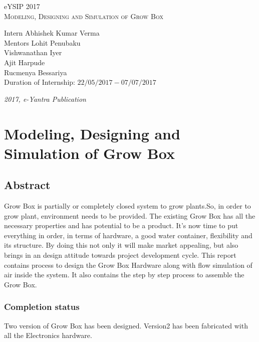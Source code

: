 \documentclass[a4paper,12pt,oneside]{book}
\begin{document}
\begin{titlepage}
\raggedright
{\Large eYSIP 2017\\[1cm]}
{\Huge\scshape Modeling, Designing and Simulation of Grow Box \\[.1in]}
\vfill
\begin{flushright}
{\large Intern Abhishek Kumar Verma \\}
{\large Mentors \hspace{35pt} Lohit Penubaku \\}
{\large Vishwanathan Iyer \\}
{\large Ajit Harpude \\}
{\large Rucmenya Bessariya \\}
{\large Duration of Internship: $ 22/05/2017-07/07/2017 $ \\}
\end{flushright}

{\itshape 2017, e-Yantra Publication}
\end{titlepage}

\chapter[Project Tag]{Modeling, Designing and Simulation of Grow Box}
\section*{Abstract}
Grow Box is partially or completely closed system to grow plants.So, in order to grow plant, environment needs to be provided. The existing Grow Box has all the necessary properties and has potential to be a product. It's now time to put everything in order, in terms of hardware, a good water container, flexibility and its structure. By doing this not only it will make market appealing, but also brings in an design attitude towards project development cycle. This report contains process to design the Grow Box Hardware along with flow simulation of air inside the system. It also contains the step by step process to assemble the Grow Box.

\subsection*{Completion status}
Two version of Grow Box has been designed. Version2 has been fabricated with all the Electronics hardware.
\end{document}
